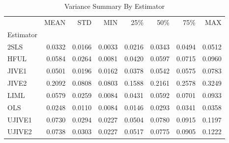 \begin{table}[ht]
\centering
\caption{Variance Summary By Estimator}
\begin{tabular}{lrrrrrrr}
\toprule
 & MEAN & STD & MIN & 25\% & 50\% & 75\% & MAX \\
Estimator &  &  &  &  &  &  &  \\
\midrule
2SLS & 0.0332 & 0.0166 & 0.0033 & 0.0216 & 0.0343 & 0.0494 & 0.0512 \\
HFUL & 0.0584 & 0.0264 & 0.0081 & 0.0420 & 0.0597 & 0.0715 & 0.0960 \\
JIVE1 & 0.0501 & 0.0196 & 0.0162 & 0.0378 & 0.0542 & 0.0575 & 0.0783 \\
JIVE2 & 0.2092 & 0.0808 & 0.0803 & 0.1588 & 0.2161 & 0.2578 & 0.3249 \\
LIML & 0.0579 & 0.0259 & 0.0084 & 0.0431 & 0.0592 & 0.0701 & 0.0933 \\
OLS & 0.0248 & 0.0110 & 0.0084 & 0.0146 & 0.0293 & 0.0341 & 0.0358 \\
UJIVE1 & 0.0730 & 0.0294 & 0.0227 & 0.0504 & 0.0780 & 0.0915 & 0.1197 \\
UJIVE2 & 0.0738 & 0.0303 & 0.0227 & 0.0517 & 0.0775 & 0.0905 & 0.1222 \\
\bottomrule
\end{tabular}
\end{table}
